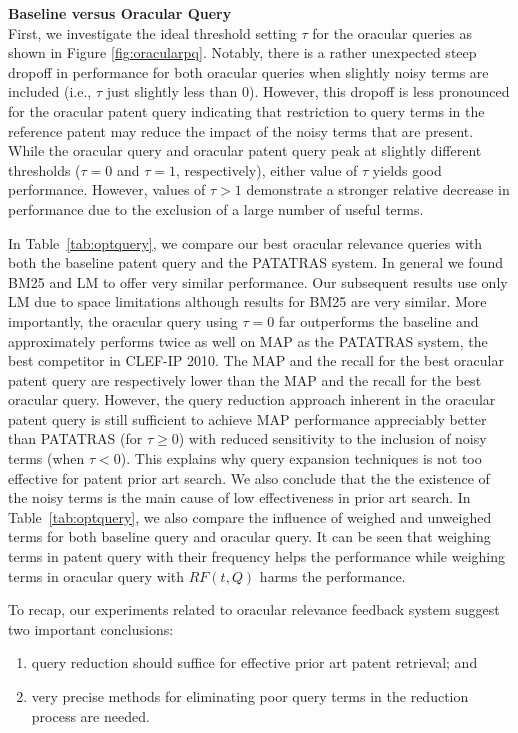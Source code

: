\textbf{Baseline versus Oracular Query}
\ \\
First, we investigate the ideal threshold setting $\tau$ for the
oracular queries as shown in Figure \ref{fig:oracularpq}.  Notably,
there is a rather unexpected steep dropoff in performance for both
oracular queries when slightly noisy terms are included
(i.e., $\tau$ just slightly less than 0).  However, this dropoff is
less pronounced for the
oracular patent query indicating that restriction to query terms in the
reference patent may reduce the impact of the noisy terms that are present.
While the oracular query and oracular patent query peak
at slightly different thresholds ($\tau = 0$ and $\tau = 1$, respectively), 
either value of $\tau$ yields good performance.
However, values of $\tau > 1$
demonstrate a stronger relative decrease in performance due to the exclusion 
of a large number of useful terms.

In Table~\ref{tab:optquery}, we compare our best oracular relevance
queries with both the baseline patent query and the PATATRAS
system.  In general we found BM25 and LM to offer very similar
performance.  Our subsequent results use only LM due to space
limitations although results for BM25 are very similar.  More
importantly, the oracular query using $\tau=0$ far
outperforms the baseline and approximately performs twice as well on
MAP as the PATATRAS system, the best competitor in CLEF-IP 2010.  The
MAP and the recall for the best oracular patent query are
respectively lower than the MAP and the recall for the
best oracular query.  However, the query reduction approach
inherent in the oracular patent query is still sufficient to
achieve MAP performance appreciably better than PATATRAS (for
$\tau \geq 0$) with reduced sensitivity to the inclusion of noisy
terms (when $\tau < 0$). 
This explains why query expansion techniques is not too effective for patent prior art search. We also conclude that the the existence of the noisy terms is the main cause of low effectiveness in prior art search. In Table~\ref{tab:optquery}, we also compare the influence of weighed and unweighed terms for both baseline query and oracular query. It can be seen that weighing terms in patent query with their frequency helps the performance while weighing terms in oracular query with $RF(t, Q)$ harms the performance.  

To recap, our experiments related to oracular relevance feedback system
suggest two important conclusions: 
\begin{enumerate}
\item query reduction should suffice for effective prior art patent retrieval; and  
\item very precise methods for eliminating poor query terms in the reduction process are needed.
\end{enumerate}


